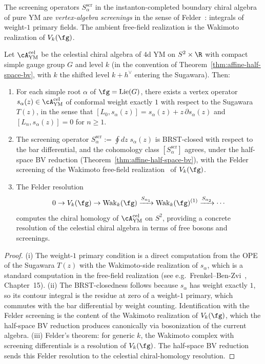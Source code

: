 The screening operators $S_\alpha^{\mathrm{scr}}$ in the
instanton-completed boundary chiral algebra of pure YM are
\emph{vertex-algebra screenings} in the sense of
Felder~\cite{FelderVOA}: integrals of weight-$1$ primary fields. The
ambient free-field realization is the Wakimoto realization of
$V_k(\fg)$.

\begin{proposition}
\label{prop:screenings-are-felder-primaries}
Let $\cA^{\mathrm{cel}}_{\mathrm{YM}}$ be the celestial chiral
algebra of $4$d YM on $S^2\times\R$ with compact simple gauge
group $G$ and level $k$ (in the convention of
Theorem~\ref{thm:affine-half-space-bv}, with $k$ the shifted level
$k+h^\vee$ entering the Sugawara). Then:
\begin{enumerate}[label=\textup{(\roman*)}]
\item For each simple root $\alpha$ of $\fg=\mathrm{Lie}(G)$, there
exists a vertex operator $s_\alpha(z)\in \cA^{\mathrm{cel}}_{\mathrm{YM}}$
of conformal weight exactly $1$ with respect to the Sugawara
$T(z)$, in the sense that $[L_0, s_\alpha(z)] = s_\alpha(z) +
z\,\partial s_\alpha(z)$ and $[L_n, s_\alpha(z)] = 0$ for $n\geq 1$.
\item The screening operator
$S_\alpha^{\mathrm{scr}} := \oint\!dz\; s_\alpha(z)$ is BRST-closed
with respect to the bar differential, and the cohomology class
$[S_\alpha^{\mathrm{scr}}]$ agrees, under the half-space BV
reduction (Theorem~\ref{thm:affine-half-space-bv}), with the
Felder screening of the Wakimoto free-field
realization~\cite{WakimotoFree} of $V_k(\fg)$.
\item The Felder resolution
\[
0 \to V_k(\fg)
 \to \mathrm{Wak}_k(\fg)
 \xrightarrow{S_{\alpha_1}}
 \mathrm{Wak}_k(\fg)^{(1)}
 \xrightarrow{S_{\alpha_2}} \cdots
\]
computes the chiral homology of $\cA^{\mathrm{cel}}_{\mathrm{YM}}$
on $S^2$, providing a concrete resolution of the celestial chiral
algebra in terms of free bosons and screenings.
\end{enumerate}
\end{proposition}

\begin{proof}
(i) The weight-$1$ primary condition is a direct computation from the
OPE of the Sugawara $T(z)$ with the Wakimoto-side realization of
$s_\alpha$, which is a standard computation in the free-field
realization (see e.g.\ Frenkel--Ben-Zvi~\cite{FrenkelBenZvi},
Chapter~15). (ii) The BRST-closedness follows because $s_\alpha$
has weight exactly $1$, so its contour integral is the residue at
zero of a weight-$1$ primary, which commutes with the bar
differential by weight counting. Identification with the Felder
screening is the content of the Wakimoto realization of $V_k(\fg)$,
which the half-space BV reduction produces canonically via
bosonization of the current algebra. (iii) Felder's theorem:
for generic $k$, the Wakimoto complex with screening differentials
is a resolution of $V_k(\fg)$. The half-space BV reduction sends
this Felder resolution to the celestial chiral-homology resolution.
\end{proof}

